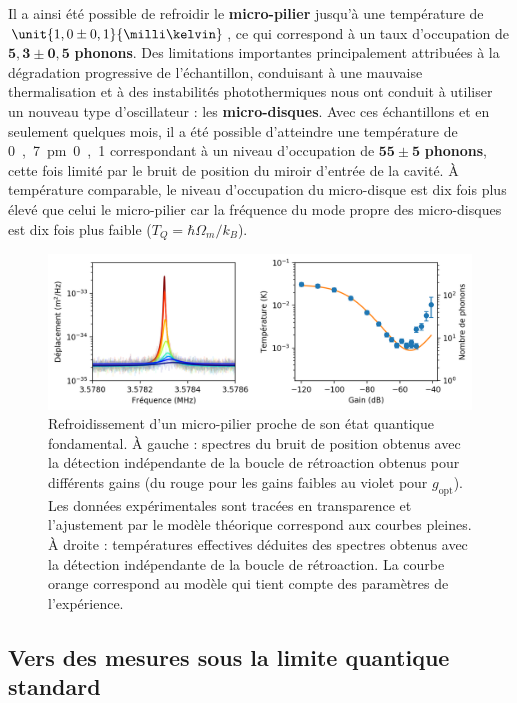 \documentclass[12pt,a4paper]{article}
\begin{document}
Il a ainsi été possible de refroidir le \textbf{micro-pilier} jusqu'à une température de $\unit{1,0\pm 0,1}{\milli\kelvin}$, ce qui correspond à un taux d'occupation de $\mathbf{5,3 \pm 0,5}$ \textbf{phonons}.
Des limitations importantes principalement attribuées à la dégradation progressive de l'échantillon, conduisant à une mauvaise thermalisation et à des instabilités photothermiques nous ont conduit à utiliser un nouveau type d'oscillateur : les \textbf{micro-disques}.
Avec ces échantillons et en seulement quelques mois, il a été possible d'atteindre une température de \unit{0,7\pm 0,1}{\milli\kelvin} correspondant à un niveau d'occupation de $\mathbf{55\pm5}$ \textbf{phonons}, cette fois limité par le bruit de position du miroir d'entrée de la cavité.
À température comparable, le niveau d'occupation du micro-disque est dix fois plus élevé que celui le micro-pilier car la fréquence du mode propre des micro-disques est dix fois plus faible ($T_Q = \hbar\Omega_m/k_B$). 

\begin{figure}
\center
\includegraphics[scale=0.75]{figures/feedback_cooling_6phonons.png}
\caption{Refroidissement d'un micro-pilier proche de son état quantique fondamental.
À gauche : spectres du bruit de position obtenus avec la détection indépendante de la boucle de rétroaction obtenus pour différents gains (du rouge pour les gains faibles au violet pour $g_\mathrm{opt}$).
Les données expérimentales sont tracées en transparence et l'ajustement par le modèle théorique correspond aux courbes pleines.
À droite : températures effectives déduites des spectres obtenus avec la détection indépendante de la boucle de rétroaction.
La courbe orange correspond au modèle qui tient compte des paramètres de l'expérience.}
\label{fig:feedback_cooling_pillar}
\end{figure}

\subsection{Vers des mesures sous la limite quantique standard}
\end{document}
